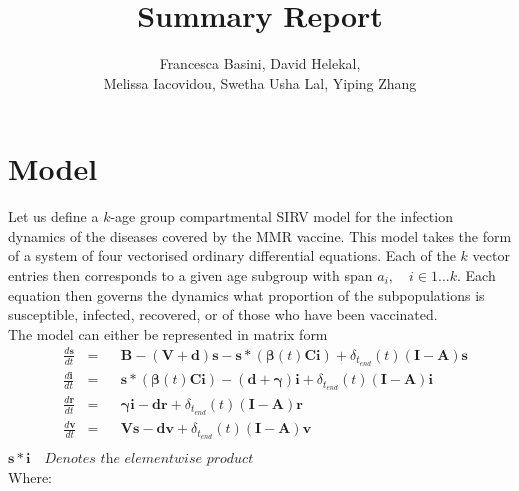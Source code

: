 \documentclass{article}
\title{Summary Report}
\author{Francesca Basini, David Helekal,\\Melissa Iacovidou, Swetha Usha Lal, Yiping Zhang}
\theoremstyle{definition}
\begin{document}
\maketitle
\newpage
\section{Model}

Let us define a $k$-age group compartmental SIRV model for the infection dynamics of the diseases covered by the MMR vaccine. This model takes the form of a system of four vectorised ordinary differential equations. Each of the $k$ vector entries then corresponds to a given age subgroup with span $a_i, \quad i\in1...k$. Each equation then governs the dynamics what proportion of the subpopulations is susceptible, infected, recovered, or of those who have been vaccinated.\\
The model can either be represented in matrix form
\begin{align*}
&\frac{d\mathbf{s}}{dt} &=&& \mathbf{B} - (\mathbf{V} + \mathbf{d})\mathbf{s} - \mathbf{s}*(\pmb{\beta}(t)\mathbf{C}\mathbf
{i})+\delta_{t_{end}}(t)(\mathbf{I}-\mathbf{A})\mathbf{s}\\
&\frac{d\mathbf{i}}{dt} &=&&\mathbf{s}*(\pmb{\beta}(t)\mathbf{C}\mathbf{i}) - (\mathbf{d} + \pmb{\gamma})\mathbf{i}+\delta_{t_{end}}(t)(\mathbf{I}-\mathbf{A})\mathbf{i}\\
&\frac{d\mathbf{r}}{dt} &=&& \pmb{\gamma}\mathbf{i} - \mathbf{d}\mathbf{r}+\delta_{t_{end}}(t)(\mathbf{I}-\mathbf{A})\mathbf{r}\\
&\frac{d\mathbf{v}}{dt} &=&& \mathbf{V}\mathbf{s}-\mathbf{d}\mathbf{v} +\delta_{t_{end}}(t)(\mathbf{I}-\mathbf{A})\mathbf{v}\\
\end{align*}
$\mathbf{s}*\mathbf{i}\quad\textit{Denotes the elementwise product}$\\
Where:
\end{document}
